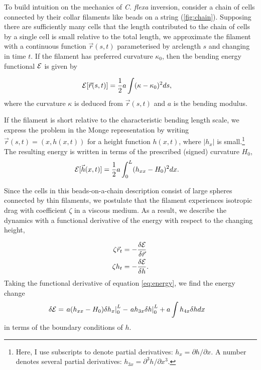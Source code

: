 To build intuition on the mechanics of \textit{C. flexa} inversion, consider a chain of cells connected by their collar filaments like beads on a string (\cref{fig:chain}). 
Supposing there are sufficiently many cells that the length contributed to the chain of cells by a single cell is small relative to the total length, we approximate the filament with a continuous function $\vec{r}(s, t)$ parameterised by arclength $s$ and changing in time $t$.
If the filament has preferred curvature $\kappa_0$, then the bending energy functional $\mathcal{E}$ is given by 

\begin{align*}
    \mathcal{E}[\vec{r}(s, t)] &= \frac{1}{2} a \int (\kappa - \kappa_0)^2 ds, 
\end{align*}
\noindent where the curvature $\kappa$ is deduced from $\vec{r}(s, t)$ and $a$ is the bending modulus. 

If the filament is short relative to the characteristic bending length scale, we express the problem in the Monge representation by writing $\vec{r}(s, t) = (x, h(x, t))$ for a height function $h(x, t)$, where $|h_x|$ is small.\footnote{Here, I use subscripts to denote partial derivatives: $h_x = \partial h / \partial x$. A number denotes several partial derivatives: $h_{3x} = \partial^3 h / \partial x^3$.} 
The resulting energy is written in terms of the prescribed (signed) curvature $H_0$, 
\begin{align}
    \mathcal{E}[\vec{h}(x, t)] &= \frac{1}{2} a \int_0^L (h_{xx} - H_0)^2 dx. \label{eq:energy}
\end{align}

Since the cells in this beads-on-a-chain description consist of large spheres connected by thin filaments, we postulate that the filament experiences isotropic drag with coefficient $\zeta$ in a viscous medium.
As a result, we describe the dynamics with a functional derivative of the energy with respect to the changing height,

\begin{align}
    \zeta \vec{r}_t &= -\frac{\delta \mathcal{E}}{\delta \vec{r}} \nonumber \\
    \zeta h_t &= -\frac{\delta \mathcal{E}}{\delta h}. \label{eq:eom} 
\end{align}
Taking the functional derivative of equation \ref{eq:energy}, we find the energy change
\begin{align}
    \delta \mathcal{E} &= \left. a(h_{xx} - H_0)\delta h_x \right|_0^L - \left. ah_{3x} \delta h \right|_0^L + a \int h_{4x} \delta h dx \label{eq:func_deriv} 
\end{align}
in terms of the boundary conditions of $h$.

